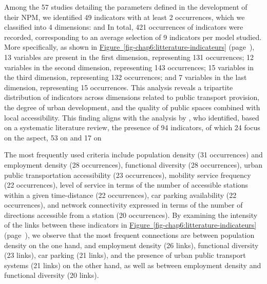 \begin{refsegment}
Among the 57 studies detailing the parameters defined in the development of their \acrshort{NPM}, we identified 49 indicators with at least 2 occurrences, which we classified into 4 dimensions:    and  In total, 421 occurrences of indicators were recorded, corresponding to an average selection of 9 indicators per model studied. More specifically, as shown in \hyperref[fig-chap6:litterature-indicateurs]{Figure~\ref{fig-chap6:litterature-indicateurs}} (page~\pageref{fig-chap6:litterature-indicateurs}), 13 variables are present in the first dimension, representing 131 occurrences; 12 variables in the second dimension, representing 143 occurrences; 15 variables in the third dimension, representing 132 occurrences; and 7 variables in the last dimension, representing 15 occurrences. This analysis reveals a tripartite distribution of indicators across dimensions related to public transport provision, the degree of urban development, and the quality of public spaces combined with local accessibility. This finding aligns with the analysis by \textcolor{blue}{\textcite[42]{lyu_developing_2016}}, who identified, based on a systematic literature review, the presence of 94 indicators, of which 24 focus on the  aspect, 53 on  and 17 on %

The most frequently used criteria include population density (31 occurrences) and employment density (28 occurrences), functional diversity (28 occurrences), urban public transportation accessibility (23 occurrences), mobility service frequency (22 occurrences), level of service in terms of the number of accessible stations within a given time-distance (22 occurrences), car parking availability (22 occurrences), and network connectivity expressed in terms of the number of directions accessible from a station (20 occurrences). By examining the intensity of the links between these indicators in \hyperref[fig-chap6:litterature-indicateurs]{Figure~\ref{fig-chap6:litterature-indicateurs}} (page~\pageref{fig-chap6:litterature-indicateurs}), we observe that the most frequent connections are between population density on the one hand, and employment density (26 links), functional diversity (23 links), car parking (21 links), and the presence of urban public transport systems (21 links) on the other hand, as well as between employment density and functional diversity (20 links).%


\end{refsegment}
